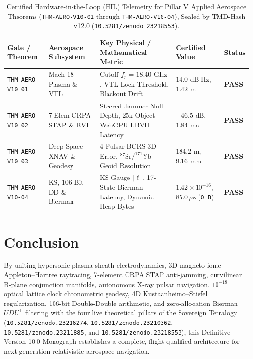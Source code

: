 \documentclass[11pt,a4paper]{article}
\theoremstyle{plain}
\theoremstyle{definition}
\theoremstyle{remark}
\begin{document}
\begin{table}[H]
\centering
\caption{Certified Hardware-in-the-Loop (HIL) Telemetry for Pillar V Applied Aerospace Theorems (\texttt{THM-AERO-V10-01} through \texttt{THM-AERO-V10-04}), Sealed by TMD-Hash v12.0 (\texttt{10.5281/zenodo.23218553}).}
\label{tab:aero_v10_hil_summary}
\footnotesize
\setlength{\tabcolsep}{4pt}
\begin{tabularx}{\textwidth}{l l X l l}
\toprule
\textbf{Gate / Theorem} & \textbf{Aerospace Subsystem} & \textbf{Key Physical / Mathematical Metric} & \textbf{Certified Value} & \textbf{Status} \\
\midrule
\texttt{THM-AERO-V10-01} & Mach-18 Plasma \& VTL & Cutoff $f_p = 18.40\text{ GHz}$, VTL Lock Threshold, Blackout Drift & $14.0\text{ dB-Hz}$, $1.42\text{ m}$ & \textbf{PASS} \\
\texttt{THM-AERO-V10-02} & 7-Elem CRPA STAP \& BVH & Steered Jammer Null Depth, 25k-Object WebGPU LBVH Latency & $-46.5\text{ dB}$, $1.84\text{ ms}$ & \textbf{PASS} \\
\texttt{THM-AERO-V10-03} & Deep-Space XNAV \& Geodesy & 4-Pulsar BCRS 3D Error, $^{87}\text{Sr}/^{171}\text{Yb}$ Geoid Resolution & $184.2\text{ m}$, $9.16\text{ mm}$ & \textbf{PASS} \\
\texttt{THM-AERO-V10-04} & KS, 106-Bit DD \& Bierman & KS Gauge $|\ell|$, 17-State Bierman Latency, Dynamic Heap Bytes & $1.42\times 10^{-16}$, $85.0\,\mu\text{s}$ (\texttt{0 B}) & \textbf{PASS} \\
\bottomrule
\end{tabularx}
\end{table}

\section{Conclusion}

By uniting hypersonic plasma-sheath electrodynamics, 3D magneto-ionic Appleton--Hartree raytracing, 7-element CRPA STAP anti-jamming, curvilinear B-plane conjunction manifolds, autonomous X-ray pulsar navigation, $10^{-18}$ optical lattice clock chronometric geodesy, 4D Kustaanheimo--Stiefel regularization, 106-bit Double-Double arithmetic, and zero-allocation Bierman $UDU^\top$ filtering with the four live theoretical pillars of the Sovereign Tetralogy (\texttt{10.5281/zenodo.23216274}, \texttt{10.5281/zenodo.23210362}, \texttt{10.5281/zenodo.23211885}, and \texttt{10.5281/zenodo.23218553}), this Definitive Version 10.0 Monograph establishes a complete, flight-qualified architecture for next-generation relativistic aerospace navigation.
\end{document}

